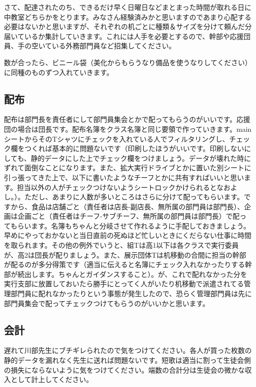 \documentclass[a4paper]{ltjsreport}
\begin{document}
さて、配達されたのち、できるだけ早く日曜日などまとまった時間が取れる日に中教室どちらかをとります。みなさん経験済みかと思いますのであまり心配する必要はないかと思いますが、それぞれの机ごとに種類＆サイズを分けて頼んだ分届いているか集計していきます。これには人手を必要とするので、幹部や応援団員、手の空いている外務部門員など招集してください。

数が合ったら、ビニール袋（美化からもらうなり備品を使うなりしてください）に同種のものずつ入れていきます。

\subsection{配布}
配布は部門長を責任者にして部門員集会とかで配ってもらうのがいいです。応援団の場合は団長です。配布名簿をクラス名簿と同じ要領で作っていきます。mainシートからそのTシャツにチェックを入れている人でフィルタリングし、チェック欄をつくれば基本的に問題ないです（印刷したほうがいいです。印刷しないにしても、静的データにした上でチェック欄をつけましょう。データが壊れた時にずれて面倒なことになります。また、拡大実行ドライブとかに置いた別シートに引っ張ってきた上で、以下に書いたようなチーフとかに共有すればいいと思います。担当以外の人がチェックつけないようシートロックかけられるとなおよし。）。ただし、あまりに人数が多いところはさらに分けて配ってもらいます。ですから、食品は店舗ごと（責任者は店長-副店長、無所属の部門員は部門長）、企画は企画ごと（責任者はチーフ-サブチーフ、無所属の部門員は部門長）で配ってもらいます。名簿もちゃんと分岐させて作れるように手配しておきましょう。早めにやっておかないと当日直前の死ぬほど忙しいときにくだらない仕事に時間を取られます。その他の例外でいうと、組Tは高1以下は各クラスで実行委員が、高2は団長が配りましょう。また、展示団体Tは机移動の合間に担当の幹部が配るのが多分得策です（適当に伝えると名簿にチェック入れなかったりする幹部が続出します。ちゃんとガイダンスすること）。が、これで配れなかった分を実行支部に放置しておいたら勝手にとってく人がいたり机移動で派遣されてる管理部門員に配れなかったりという事態が発生したので、恐らく管理部門員は先に部門員集会で配ってチェックつけてもらうのがいいかと思います。

\subsection{会計}
遅れて川部先生にブチギレられたので気をつけてください。各人が買った枚数の静的データを漏れなく先生に送れば問題ないです。短歌は適当に割って生徒会側の損失にならないように気をつけてください。端数の合計分は生徒会の微かな収入として計上してください。
\end{document}
